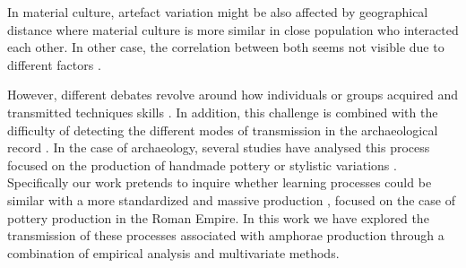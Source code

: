 \documentclass[review]{elsarticle}
\begin{document}

 In material culture, artefact variation might be also affected by geographical distance \citep{bjorklund_effect_2010,shennan_isolation-by-distance_2015, van_strien_isolation-by-distance_2015} where material culture is more similar in close population who interacted each other. In other case, the correlation between both seems not visible due to different factors \citep{hart_effects_2012}. 





However, different debates revolve around how individuals or groups acquired and transmitted techniques skills \citep{bowser_learning_2008, mesoudi_cultural_2008}. In addition, this challenge is combined with the difficulty of detecting the different modes of transmission in the archaeological record \citep{roux_standardization_2015}. In the case of archaeology, several studies have analysed this process focused on the production of handmade pottery \citep{steele_james_ceramic_2010} or stylistic variations \citep{neiman_stylistic_1995, shennan_ceramic_2001}. Specifically our work pretends to inquire whether learning processes could be similar with a more standardized and massive production \citep{gandon_copying_2014}, focused on the case of pottery production in the Roman Empire. In this work we have explored the transmission of these processes associated with amphorae production through a combination of empirical analysis and multivariate methods.
                     
\end{document}
